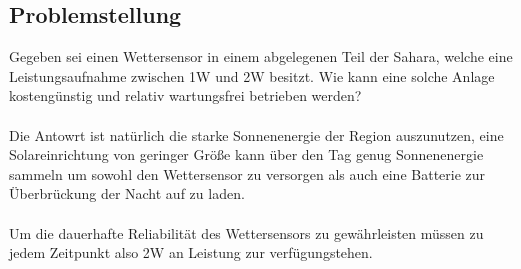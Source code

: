 \subsection{Problemstellung}
    Gegeben sei einen Wettersensor in einem abgelegenen Teil der Sahara,
    welche eine Leistungsaufnahme zwischen 1W und 2W besitzt. Wie kann
    eine solche Anlage kostengünstig und relativ wartungsfrei betrieben
    werden?
    \\\\
    Die Antowrt ist natürlich die starke Sonnenenergie der Region auszunutzen,
    eine Solareinrichtung von geringer Größe kann über den Tag genug
    Sonnenenergie sammeln um sowohl den Wettersensor zu versorgen als auch
    eine Batterie zur Überbrückung der Nacht auf zu laden.
    \\\\
    Um die dauerhafte Reliabilität des Wettersensors zu gewährleisten müssen
    zu jedem Zeitpunkt also 2W an Leistung zur verfügungstehen.

